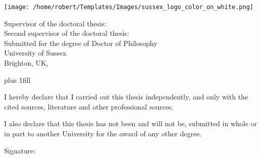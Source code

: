

\pagestyle{empty}
\hypersetup{pageanchor=false}
\begin{center}

\centerline{\mbox{\texttt{[image: /home/robert/Templates/Images/sussex\_logo\_color\_on\_white.png]}}}

\vfill

{\LARGE\bfseries\ThesisTitle}

\vfill

{\LARGE\ThesisAuthor}

\end{center}

\vfill

\begin{spacing}{2}
\begin{large}
\noindent
Supervisor of the doctoral thesis: \Supervisor \\
Second supervisor of the doctoral thesis: \SecondSupervisor \\
Submitted for the degree of Doctor of Philosophy \\
University of Sussex \\
Brighton, UK, \MonthAndYearSubmitted
\end{large}
\end{spacing}




\newpage


\openright
\hypersetup{pageanchor=true}
\pagestyle{plain}
\vglue 0pt plus 1fill

\noindent
I hereby declare that I carried out this thesis independently, and only with the cited sources, literature and other professional sources.

\medskip\noindent
I also declare that this thesis has not been and will not be, submitted in whole or in part to another University for the award of any other degree.

\vspace{15mm}

\noindent Signature:\\

